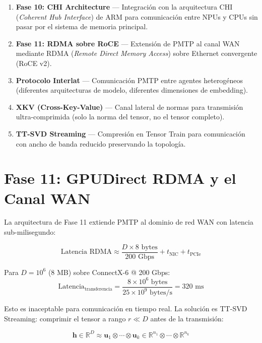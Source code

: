 \begin{enumerate}
\item \textbf{Fase 10: CHI Architecture} --- Integración con la arquitectura CHI
(\textit{Coherent Hub Interface}) de ARM para comunicación entre NPUs y CPUs
sin pasar por el sistema de memoria principal.

\item \textbf{Fase 11: RDMA sobre RoCE} --- Extensión de PMTP al canal WAN mediante
RDMA (\textit{Remote Direct Memory Access}) sobre Ethernet convergente (RoCE v2).

\item \textbf{Protocolo Interlat} --- Comunicación PMTP entre agentes heterogéneos
(diferentes arquitecturas de modelo, diferentes dimensiones de embedding).

\item \textbf{XKV (Cross-Key-Value)} --- Canal lateral de normas para transmisión
ultra-comprimida (solo la norma del tensor, no el tensor completo).

\item \textbf{TT-SVD Streaming} --- Compresión en Tensor Train para comunicación
con ancho de banda reducido preservando la topología.
\end{enumerate}

\section{Fase 11: GPUDirect RDMA y el Canal WAN}

La arquitectura de Fase 11 extiende PMTP al dominio de red WAN con latencia sub-milisegundo:

\begin{equation}
\text{Latencia RDMA} \approx \frac{D \times 8 \text{ bytes}}{200 \text{ Gbps}} + t_{\text{NIC}} + t_{\text{PCIe}}
\end{equation}

Para $D = 10^6$ (8 MB) sobre ConnectX-6 @ 200 Gbps:
\begin{equation}
\text{Latencia}_{\text{transferencia}} = \frac{8 \times 10^6 \text{ bytes}}{25 \times 10^9 \text{ bytes/s}} = 320 \text{ ms}
\end{equation}

Esto es inaceptable para comunicación en tiempo real. La solución es TT-SVD Streaming:
comprimir el tensor a rango $r \ll D$ antes de la transmisión:

\begin{equation}
\mathbf{h} \in \mathbb{R}^D \approx \mathbf{u}_1 \otimes \cdots \otimes \mathbf{u}_k \in \mathbb{R}^{n_1} \otimes \cdots \otimes \mathbb{R}^{n_k}
\end{equation}

